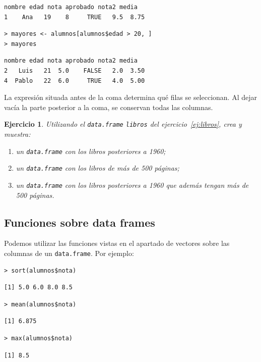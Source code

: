 \documentclass[11pt,a4paper]{article}
\theoremstyle{exercise}
\newtheorem{exercise}{Ejercicio}
\begin{document}
\begin{lstlisting}[style=routput]
  nombre edad nota aprobado nota2 media
1    Ana   19    8     TRUE   9.5  8.75
\end{lstlisting}

\begin{lstlisting}[style=rconsole]
> mayores <- alumnos[alumnos$edad > 20, ]
> mayores
\end{lstlisting}

\begin{lstlisting}[style=routput]
  nombre edad nota aprobado nota2 media
2   Luis   21  5.0    FALSE   2.0  3.50
4  Pablo   22  6.0     TRUE   4.0  5.00
\end{lstlisting}

La expresión situada antes de la coma determina qué filas se seleccionan. Al dejar vacía la parte posterior a la coma, se conservan todas las columnas.

\begin{exercise}
Utilizando el \texttt{data.frame} \texttt{libros} del ejercicio~\ref{ej:libros}, crea y muestra:
\begin{enumerate}
    \item[a)] un \texttt{data.frame} con los libros posteriores a 1960;
    \item[b)] un \texttt{data.frame} con los libros de más de 500 páginas;
    \item[c)] un \texttt{data.frame} con los libros posteriores a 1960 que además tengan más de 500 páginas.
\end{enumerate}
\end{exercise}

\subsection{Funciones sobre data frames}

Podemos utilizar las funciones vistas en el apartado de vectores sobre las columnas de un \texttt{data.frame}. Por ejemplo:

\begin{lstlisting}[style=rconsole]
> sort(alumnos$nota)
\end{lstlisting}
\begin{lstlisting}[style=routput]
[1] 5.0 6.0 8.0 8.5
\end{lstlisting}
\begin{lstlisting}[style=rconsole]
> mean(alumnos$nota)
\end{lstlisting}
\begin{lstlisting}[style=routput]
[1] 6.875
\end{lstlisting}
\begin{lstlisting}[style=rconsole]
> max(alumnos$nota)
\end{lstlisting}
\begin{lstlisting}[style=routput]
[1] 8.5
\end{lstlisting}
\end{document}
